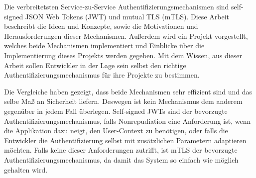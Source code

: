 \documentclass[14pt,a4paper]{extarticle}
\begin{document}
Die verbreitetsten Service-zu-Service Authentifizierungsmechanismen sind self-signed JSON Web Tokens (JWT) und mutual TLS (mTLS).
Diese Arbeit beschreibt die Ideen und Konzepte, sowie die Motivationen und Herausforderungen dieser Mechanismen.
Außerdem wird ein Projekt vorgestellt, welches beide Mechanismen implementiert und Einblicke über die Implementierung dieses Projekts werden gegeben.
Mit dem Wissen, aus dieser Arbeit sollen Entwickler in der Lage sein selbst den richtige Authentifizierungsmechanismus für ihre Projekte zu bestimmen.

Die Vergleiche haben gezeigt, dass beide Mechanismen sehr effizient sind und das selbe Maß an Sicherheit liefern.
Deswegen ist kein Mechanismus dem anderem gegenüber in jedem Fall überlegen.
Self-signed JWTs sind der bevorzugte Authentifizierungsmechanismus, falls Nonrepudiation eine Anforderung ist, wenn die Applikation dazu neigt, den User-Context zu benötigen, oder falls die Entwickler die Authentifizierung selbst mit zusätzlichen Parametern adaptieren möchten.
Falls keine dieser Anforderungen zutrifft, ist mTLS der bevorzugte Authentifizierungsmechanismus, da damit das System so einfach wie möglich gehalten wird.
\end{document}
